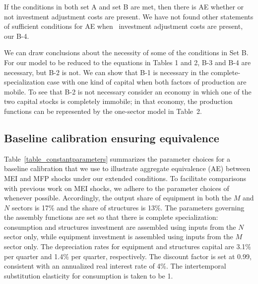 \documentclass[12pt,fleqn]{article}
\begin{document}
If the conditions in both set A and set B are met, then there is AE whether
or not investment adjustment costs are present. We have not found other statements of sufficient
conditions for AE when \ investment adjustment costs are present, our B-4.

We can draw conclusions about the necessity of some of the conditions in Set
B. For our model to be reduced to the equations in Tables 1 and 2, B-3 and B-4 are
necessary, but B-2 is not. We can show that B-1 is necessary  in the
complete-specialization case with one kind of capital when both factors of
production are mobile. To see that B-2 is not necessary consider an economy
in which one of the two capital stocks is completely immobile; in that
economy, the production functions can be represented by the one-sector model
in Table~2.

\subsection{\protect\normalsize Baseline calibration ensuring equivalence}

Table~\ref{table_constantparameters} summarizes the parameter
choices for a baseline calibration that we use to illustrate aggregate
equivalence (AE) between MEI and MFP shocks under our extended conditions.
To facilitate comparisons with previous work on MEI shocks, we adhere to the
parameter choices of  whenever possible.
Accordingly, the output share of equipment in both the $M$ and $N$ sectors
is 17\% and the share of structures is 13\%. The parameters governing the
assembly functions are set so that there is complete specialization:
consumption and structures investment are assembled using inputs from the $N$
sector only, while equipment investment is assembled using inputs from the $%
M $ sector only. The depreciation rates for equipment and
structures capital are 3.1\% per quarter and 1.4\% per quarter,
respectively. The discount factor is set at 0.99, consistent with an
annualized real interest rate of 4\%. The intertemporal substitution
elasticity for consumption is taken to be 1.
\end{document}
